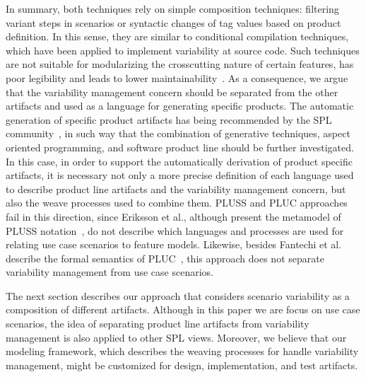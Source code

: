 \documentclass{llncs}
\begin{document}
In summary, both techniques rely on simple composition techniques: filtering variant steps in scenarios or syntactic changes of tag values based on product definition. In this sense, they are similar to conditional compilation techniques, which have been applied to implement variability at source code. Such techniques are not suitable for modularizing the crosscutting nature of certain features, has poor legibility and leads to lower maintainability~\cite{alves-gpce-06}. 
As a consequence, we argue that the variability management concern should be separated from the other artifacts and used as a language for generating specific products. The automatic generation of specific product artifacts has being recommended by the SPL community~\cite{krueger-cacm-200712,greenfield-softwarefactories,czarnecki-book}, in such way that the combination of generative techniques, aspect oriented programming, and software product line should be further investigated. In this case, in order to support the automatically derivation of product specific artifacts, it is necessary not only a more precise definition of each language used to describe product line artifacts and the variability management concern, but also the weave processes used to combine them. PLUSS and PLUC approaches fail in this direction, since Eriksson et al., although present the metamodel of PLUSS notation~\cite{eriksson-splc-2005}, do not describe which languages and processes are used for relating use case scenarios to feature models. Likewise, besides Fantechi et al. describe the formal semantics of PLUC~\cite{fantechi-splc-2004}, this approach does not separate variability management from use case scenarios.

The next section describes our approach that considers scenario variability as a composition of different artifacts. Although in this paper we are focus on use case scenarios, the idea of separating product line artifacts from variability management is also applied to other SPL views. Moreover, we believe that our modeling framework, which describes the weaving processes for handle variability management, might be customized for design, implementation, and test artifacts. 




\end{document}
